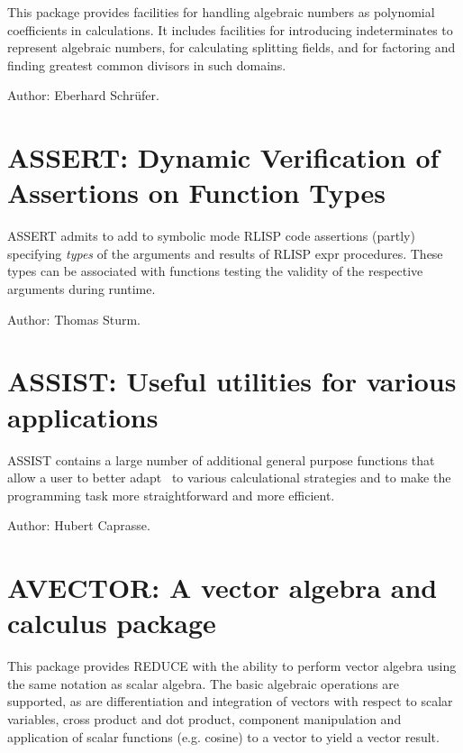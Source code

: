 This package provides facilities for handling algebraic numbers as
polynomial coefficients in {\REDUCE} calculations. It includes facilities for
introducing indeterminates to represent algebraic numbers, for calculating
splitting fields, and for factoring and finding greatest common divisors
in such domains.

Author: Eberhard Schr\"ufer.



\newpage

\section{ASSERT: Dynamic Verification of Assertions on Function Types}
\label{ASSERT}

ASSERT admits to add to symbolic mode RLISP code assertions (partly)          
specifying \emph{types} of the arguments and results of RLISP expr
procedures. These types can be associated with functions testing the
validity of the respective arguments during runtime.

Author: Thomas Sturm.



\newpage

\section{ASSIST: Useful utilities for various applications} 
\label{ASSIST}\hypertarget{ASSIST}{}

ASSIST contains a large number of additional general purpose functions
that allow a user to better adapt \REDUCE\ to various calculational
strategies and to make the programming task more straightforward and more
efficient.

Author: Hubert Caprasse.



\newpage

\section{AVECTOR: A vector algebra and calculus package} 

This package provides REDUCE with the ability to perform vector algebra
using the same notation as scalar algebra.  The basic algebraic operations
are supported, as are differentiation and integration of vectors with
respect to scalar variables, cross product and dot product, component
manipulation and application of scalar functions (e.g. cosine) to a vector
to yield a vector result.

